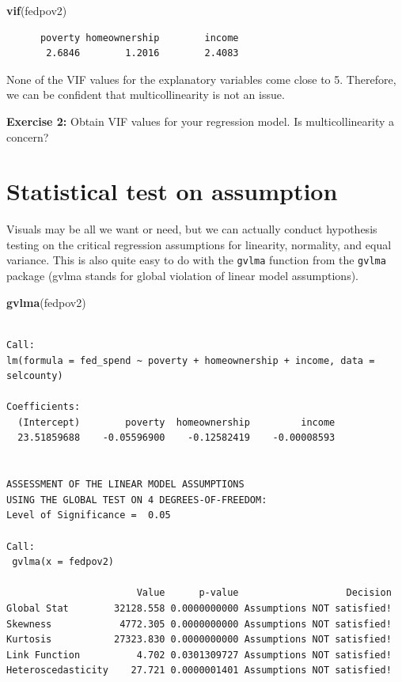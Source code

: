 \documentclass[
]{book}
\makeatletter
\newenvironment{Shaded}{\begin{snugshade}}{\end{snugshade}}
\newcommand{\FunctionTok}[1]{\textcolor[rgb]{0.27,0.27,0.27}{\textbf{#1}}}
\newcommand{\NormalTok}[1]{#1}
\newenvironment{kframe}{%
\medskip{}
\setlength{\fboxsep}{.8em}
 \def\at@end@of@kframe{}%
 \ifinner\ifhmode%
  \def\at@end@of@kframe{\end{minipage}}%
  \begin{minipage}{\columnwidth}%
 \fi\fi%
 \def\FrameCommand##1{\hskip\@totalleftmargin \hskip-\fboxsep
 \colorbox{shadecolor}{##1}\hskip-\fboxsep
     \hskip-\linewidth \hskip-\@totalleftmargin \hskip\columnwidth}%
 \MakeFramed {\advance\hsize-\width
   \@totalleftmargin\z@ \linewidth\hsize
   \@setminipage}}%
 {\par\unskip\endMakeFramed%
 \at@end@of@kframe}
\renewenvironment{Shaded}{\begin{kframe}}{\end{kframe}}
\newenvironment{rmdblock}[1]
  {\begin{shaded*}
  }
  {\end{shaded*}
  }
\newenvironment{learncheck}
  {\begin{rmdblock}{warning}}
  {\end{rmdblock}}
\makeatother
\begin{document}
\begin{Shaded}
\begin{Highlighting}[]
\FunctionTok{vif}\NormalTok{(fedpov2)}
\end{Highlighting}
\end{Shaded}

\begin{verbatim}
      poverty homeownership        income 
       2.6846        1.2016        2.4083 
\end{verbatim}

None of the VIF values for the explanatory variables come close to 5. Therefore, we can be confident that multicollinearity is not an issue.

\begin{learncheck}
\textbf{Exercise 2:} Obtain VIF values for your regression model. Is
multicollinearity a concern?
\end{learncheck}

\hypertarget{statistical-test-on-assumption}{%
\section{Statistical test on assumption}\label{statistical-test-on-assumption}}

Visuals may be all we want or need, but we can actually conduct hypothesis testing on the critical regression assumptions for linearity, normality, and equal variance. This is also quite easy to do with the \texttt{gvlma} function from the \texttt{gvlma} package (gvlma stands for global violation of linear model assumptions).

\begin{Shaded}
\begin{Highlighting}[]
\FunctionTok{gvlma}\NormalTok{(fedpov2)}
\end{Highlighting}
\end{Shaded}

\begin{verbatim}

Call:
lm(formula = fed_spend ~ poverty + homeownership + income, data = selcounty)

Coefficients:
  (Intercept)        poverty  homeownership         income  
  23.51859688    -0.05596900    -0.12582419    -0.00008593  


ASSESSMENT OF THE LINEAR MODEL ASSUMPTIONS
USING THE GLOBAL TEST ON 4 DEGREES-OF-FREEDOM:
Level of Significance =  0.05 

Call:
 gvlma(x = fedpov2) 

                       Value      p-value                   Decision
Global Stat        32128.558 0.0000000000 Assumptions NOT satisfied!
Skewness            4772.305 0.0000000000 Assumptions NOT satisfied!
Kurtosis           27323.830 0.0000000000 Assumptions NOT satisfied!
Link Function          4.702 0.0301309727 Assumptions NOT satisfied!
Heteroscedasticity    27.721 0.0000001401 Assumptions NOT satisfied!
\end{verbatim}
\end{document}
